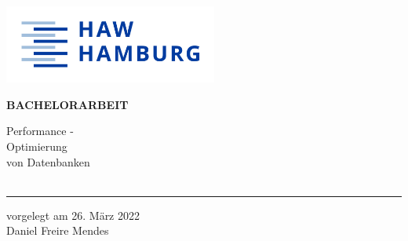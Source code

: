 \begin{titlepage}
  \color{haw}
  \raggedright
  \hfill\includegraphics[width=7cm]{PNGs/General/HAW_Marke_RGB_300dpi}\\

  \vspace{5cm}

  \setmainfont{Open Sans}
  \small
  \textbf{BACHELORARBEIT}

  \vspace{8mm}

  \begin{minipage}{0.8\linewidth}
    \setmainfont{Martel Heavy}
    \LARGE
    Performance -\\[1mm]
    Optimierung\\[1mm]
    von Datenbanken\\
    \,\rule{11mm}{1.2mm}
  \end{minipage}

  \vspace{1cm}

  vorgelegt am 26. März 2022\\
  Daniel Freire Mendes

  \vspace{5cm}


\end{titlepage}

